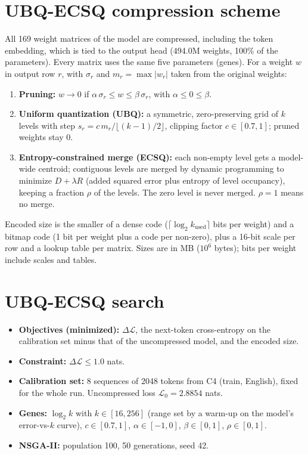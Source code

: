 \documentclass[11pt]{article}
\newcommand{\dloss}{\Delta\mathcal{L}}
\begin{document}
\section{UBQ-ECSQ compression scheme}

All 169 weight matrices of the model are compressed, including the token embedding, which is tied to
the output head (494.0M weights, 100\% of the parameters). Every matrix uses the same five parameters
(genes). For a weight $w$ in output row $r$, with $\sigma_r$ and $m_r=\max|w_r|$ taken from the
original weights:
\begin{enumerate}[label=\arabic*.]
  \item \textbf{Pruning:} $w\to0$ if $\alpha\,\sigma_r \le w \le \beta\,\sigma_r$, with $\alpha\le0\le\beta$.
  \item \textbf{Uniform quantization (UBQ):} a symmetric, zero-preserving grid of $k$ levels with step
        $s_r = c\,m_r / \lfloor (k-1)/2 \rfloor$, clipping factor $c\in[0.7,1]$; pruned weights stay 0.
  \item \textbf{Entropy-constrained merge (ECSQ):} each non-empty level gets a model-wide centroid;
        contiguous levels are merged by dynamic programming to minimize $D+\lambda R$ (added squared
        error plus entropy of level occupancy), keeping a fraction $\rho$ of the levels. The zero level
        is never merged. $\rho=1$ means no merge.
\end{enumerate}
Encoded size is the smaller of a dense code ($\lceil\log_2 k_\text{used}\rceil$ bits per weight) and a
bitmap code (1 bit per weight plus a code per non-zero), plus a 16-bit scale per row and a lookup table
per matrix. Sizes are in MB ($10^6$ bytes); bits per weight include scales and tables.

\section{UBQ-ECSQ search}

\begin{itemize}
  \item \textbf{Objectives (minimized):} $\dloss$, the next-token cross-entropy on the calibration set
        minus that of the uncompressed model, and the encoded size.
  \item \textbf{Constraint:} $\dloss \le 1.0$ nats.
  \item \textbf{Calibration set:} 8 sequences of 2048 tokens from C4 (train, English), fixed for the
        whole run. Uncompressed loss $\mathcal{L}_0 = 2.8854$ nats.
  \item \textbf{Genes:} $\log_2 k$ with $k\in[16,256]$ (range set by a warm-up on the model's
        error-vs-$k$ curve), $c\in[0.7,1]$, $\alpha\in[-1,0]$, $\beta\in[0,1]$, $\rho\in[0,1]$.
  \item \textbf{NSGA-II:} population 100, 50 generations, seed 42.
\end{itemize}
\end{document}
